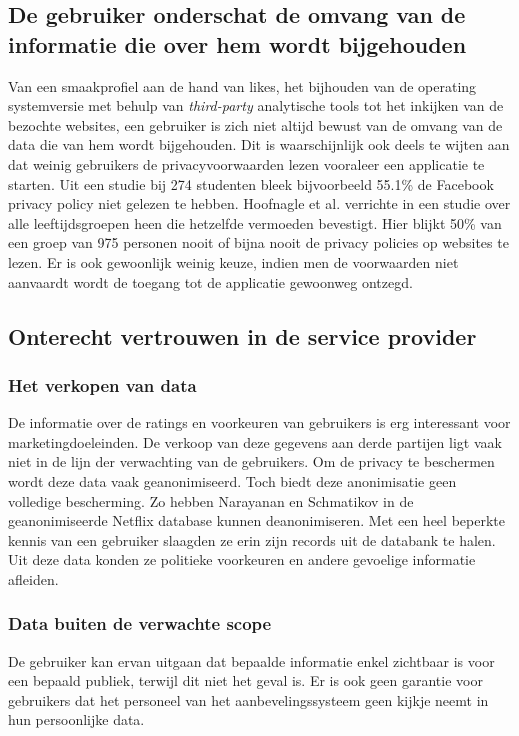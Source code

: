 \subsection{De gebruiker onderschat de omvang van de informatie die over hem wordt bijgehouden}
Van een smaakprofiel aan de hand van likes, het bijhouden van de operating systemversie met behulp van \emph{third-party} analytische tools tot het inkijken van de bezochte websites, een gebruiker is zich niet altijd bewust van de omvang van de data die van hem wordt bijgehouden\cite{pirs}. Dit is waarschijnlijk ook deels te wijten aan dat weinig gebruikers de privacyvoorwaarden lezen vooraleer een applicatie te starten. Uit een studie \cite{privdisc} bij 274 studenten bleek bijvoorbeeld 55.1\% de Facebook privacy policy niet gelezen te hebben. Hoofnagle et al. verrichte in \cite{hoofnagle} een studie over alle leeftijdsgroepen heen die hetzelfde vermoeden bevestigt. Hier blijkt  50\% van een groep van 975 personen nooit of bijna nooit de privacy policies op websites te lezen. Er is ook gewoonlijk weinig keuze, indien men de voorwaarden niet aanvaardt wordt de toegang tot de applicatie gewoonweg ontzegd. 
\subsection{Onterecht vertrouwen in de service provider}
\label{onterecht_vertrouwen}
\subsubsection{Het verkopen van data}
De informatie over de ratings en voorkeuren van gebruikers is erg interessant voor marketingdoeleinden. De verkoop van deze gegevens aan derde partijen ligt vaak niet in de lijn der verwachting van de gebruikers. Om de privacy te beschermen wordt deze data vaak geanonimiseerd. Toch biedt deze anonimisatie geen volledige bescherming. Zo hebben Narayanan en Schmatikov in \cite{Narayanan2008} de geanonimiseerde Netflix database kunnen deanonimiseren. Met een heel beperkte kennis van een gebruiker slaagden ze erin zijn records uit de databank te halen. Uit deze data konden ze politieke voorkeuren en andere gevoelige informatie afleiden.
\subsubsection{Data buiten de verwachte scope \cite{pirs}}
De gebruiker kan ervan uitgaan dat bepaalde informatie enkel zichtbaar is voor een bepaald publiek, terwijl dit niet het geval is. Er is ook geen garantie voor gebruikers dat het personeel van het aanbevelingssysteem geen kijkje neemt in hun persoonlijke data.\\

